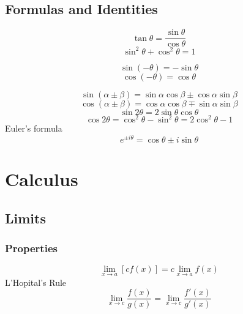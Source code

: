 \documentclass{article}
\begin{document}
	\subsection{Formulas and Identities}
		\begin{equation}
			\tan \theta = \frac{\sin \theta}{\cos \theta}
		\end{equation}
		\begin{equation}
			\sin^2 \theta + \cos^2 \theta = 1
		\end{equation}
		
		\begin{equation}
			\sin(-\theta) = - \sin \theta 
		\end{equation}
		\begin{equation}
			\cos(-\theta) = \cos \theta 
		\end{equation}
		
		\begin{equation}
			\sin \left( {\alpha \pm \beta} \right) = \sin \alpha \cos \beta \pm \cos \alpha \sin \beta
		\end{equation}
		\begin{equation}
			\cos \left( {\alpha \pm \beta } \right) = \cos \alpha \cos \beta \mp \sin \alpha \sin \beta
		\end{equation}
		\begin{equation}
			\sin 2\theta = 2\sin \theta \cos \theta
		\end{equation}
		\begin{equation}
			\cos 2\theta = \cos ^2 \theta - \sin ^2 \theta = 2\cos ^2 \theta - 1
		\end{equation}
		Euler's formula		
		\begin{equation}
			e^{ \pm i\theta } = \cos \theta \pm i\sin \theta
		\end{equation}
\section{Calculus}
	\subsection{Limits}
		\subsubsection{Properties}
			\begin{equation}
				\mathop {\lim }\limits_{x \to a} \left[ cf(x) \right] = c\mathop{\lim }\limits_{x \to a} f(x)
			\end{equation}
			L'Hopital's Rule
			\begin{equation}
				\mathop {\lim }\limits_{x \to c} \frac{{f\left( x \right)}}{{g\left( x \right)}} = \mathop {\lim }\limits_{x \to c} \frac{{f'\left( x \right)}}{{g'\left( x \right)}}
			\end{equation}
\end{document}
